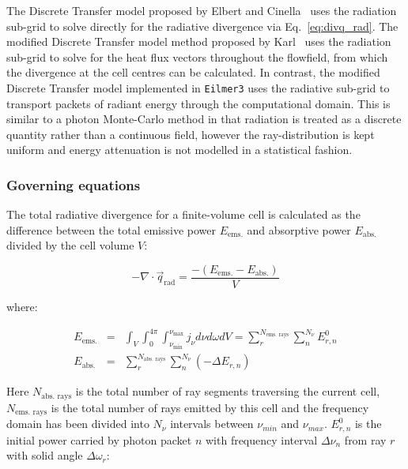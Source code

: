 \par

The Discrete Transfer model proposed by Elbert and Cinella~\cite{elbert_cinnella} uses the radiation sub-grid to solve directly for the radiative divergence via Eq.~\ref{eq:divq_rad}.
The modified Discrete Transfer model method proposed by Karl~\cite{karl2001} uses the radiation sub-grid to solve for the heat flux vectors throughout the flowfield, from which the divergence at the cell centres can be calculated.
In contrast, the modified Discrete Transfer model implemented in \texttt{Eilmer3} uses the radiative sub-grid to transport packets of radiant energy through the computational domain.
This is similar to a photon Monte-Carlo method in that radiation is treated as a discrete quantity rather than a continuous field, however the ray-distribution is kept uniform and energy attenuation is not modelled in a statistical fashion.

\subsubsection{Governing equations}

The total radiative divergence for a finite-volume cell is calculated as the difference between the total emissive power $E_{\text{ems.}}$ and absorptive power $E_{\text{abs.}}$ divided by the cell volume $V$:

\begin{equation}
 - \nabla \cdot \vec{q}_\text{rad} = \frac{ - \left ( E_{\text{ems.}} - E_{\text{abs.}} \right ) }{V}
 \label{eq:my_divq}
\end{equation}

\noindent where:

\begin{eqnarray}
 E_{\text{ems.}} &=& \int_{V} \int_{0}^{{4\pi}} \int_{\nu_{\text{min}}}^{\nu_{\text{max}}} j_{\nu} d\nu d\omega dV = \sum_{r}^{N_{\text{ems. rays}}} \sum_{n}^{N_{\nu}} E_{r,n}^0 \label{eq:E_emission} \\
 E_{\text{abs.}} &=& \sum_{r}^{N_{\text{abs. rays}}} \sum_{n}^{N_{\nu}} \left ( - \Delta E_{r,n} \right ) \label{eq:E_absorption} 
\end{eqnarray}

\noindent Here $N_{\text{abs. rays}}$ is the total number of ray segments traversing the current cell, $N_{\text{ems. rays}}$ is the total number of rays emitted by this cell and the frequency domain has been divided into $N_{\nu}$ intervals between $\nu_{min}$ and $\nu_{max}$. 
$E_{r,n}^0$ is the initial power carried by photon packet $n$ with frequency interval $\Delta \nu_{n}$ from ray $r$ with solid angle $\Delta \omega_{r}$:

